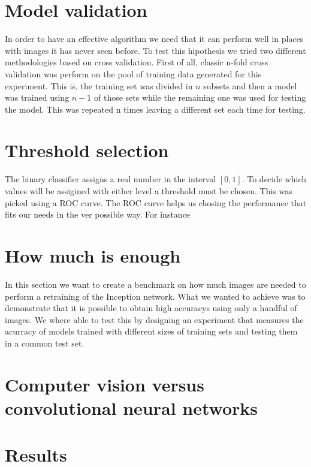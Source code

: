 \section{Model validation}

In order to have an effective algorithm we need that it can perform well in places with images it has never seen before. To test this hipothesis we tried two different methodologies based on cross validation. First of all, classic n-fold cross validation was perform on the pool of training data generated for this experiment. This is, the training set was divided in $n$ subsets and then a model was trained using $n-1$ of those sets while the remaining one was used for testing the model. This was repeated n times leaving a different set each time for testing.

\section{Threshold selection}

The binary classifier assigns a real number in the interval $[0,1]$. To decide which values will be assigined with either level a threshold must be chosen. This was picked using a ROC curve. The ROC curve helps us chosing the performance that fits our needs in the ver possible way. For instance

\section{How much is enough}

In this section we want to create a benchmark on how much images are needed to perform a retraining of the Inception network. What we wanted to achieve was to demonstrate that it is possible to obtain high accuracys using only a handful of images. We where able to test this by designing an experiment that measures the acurracy of models trained with different sizes of training sets and testing them in a common test set. 

\section{Computer vision versus convolutional neural networks}



\section{Results}
